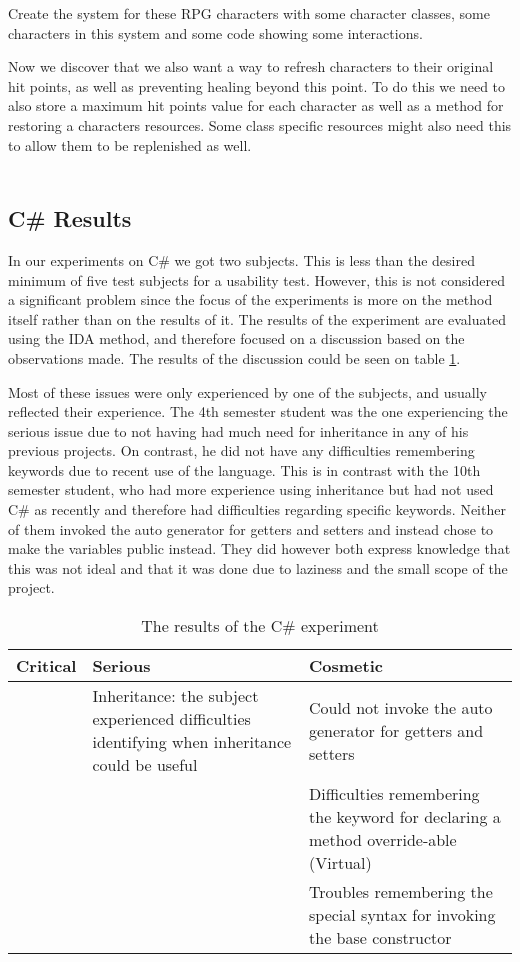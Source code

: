 Create the system for these RPG characters with some character classes, some characters in this system and some code showing some interactions.

Now we discover that we also want a way to refresh characters to their original hit points, as well as preventing healing beyond this point.
To do this we need to also store a maximum hit points value for each character as well as a method for restoring a characters resources.
Some class specific resources might also need this to allow them to be replenished as well.
\\\\


\subsection{C\# Results}
In our experiments on C\# we got two subjects. This is less than the desired minimum of five test subjects for a usability test. However, this is not considered a significant problem since the focus of the experiments is more on the method itself rather than on the results of it. The results of the experiment are evaluated using the IDA method, and therefore focused on a discussion based on the observations made. The results of the discussion could be seen on table \ref{C-usability-results}.

Most of these issues were only experienced by one of the subjects, and usually reflected their experience. The 4th semester student was the one experiencing the serious issue due to not having had much need for inheritance in any of his previous projects.
On contrast, he did not have any difficulties remembering keywords due to recent use of the language.
This is in contrast with the 10th semester student, who had more experience using inheritance but had not used C\# as recently and therefore had difficulties regarding specific keywords.
Neither of them invoked the auto generator for getters and setters and instead chose to make the variables public instead. They did however both express knowledge that this was not ideal and that it was done due to laziness and the small scope of the project.\\

\begin{table} [!h]
\centering
\renewcommand{\arraystretch}{1.5}
\label{C-usability-results}
\begin{tabular}{| p{5cm} | p{5cm} | p{5cm} |}
\hline
Critical & Serious     & Cosmetic \\ \hline
		 & Inheritance: the subject experienced difficulties identifying when inheritance could be useful & Could not invoke the auto generator for getters and setters \\ \hline 
		 & & Difficulties remembering the keyword for declaring a method override-able (Virtual) \\ \hline
		 & & Troubles remembering the special syntax for invoking the base constructor \\ \hline
\end{tabular}
\caption{The results of the C\# experiment}
\end{table}

